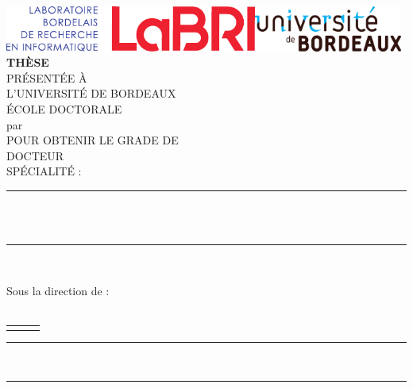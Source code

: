 \pagestyle{empty}

\pagestyle{plain} %

\newcommand{\exam}[5]{#1 \textsc{#2}  & #3, #4  & #5 \\}

\newcommand{\logoUB}{\includegraphics[height=1.5cm]{figures/ubdx-logo}}

\newcommand{\logoLaBRI}{\includegraphics[height=1.5cm]{figures/labri-logo}}


\begin{titlepage}
    \begin{center}
		\vspace*{-40pt}
		\logoLaBRI \hfill \logoUB \\
		\vfill
		\Huge  {\textbf{THÈSE}}\\
		\bigskip
		\large PRÉSENTÉE À\\
		\bigskip
		\huge  {L'UNIVERSITÉ DE BORDEAUX}\\
		\bigskip
		\Large ÉCOLE DOCTORALE {\ecoleDoctorale}\\
		\bigskip
		\Large par {\textbf{\myName}}\\
		\bigskip
		\Large POUR OBTENIR LE GRADE DE\\
		\bigskip
		\LARGE {DOCTEUR}\\
		\bigskip
		\large SPÉCIALITÉ : {\specialite}\\
		\vfill
		\rule{4em}{1pt}\\
		\bigskip
		\Large {{\myTitle}}\\
		\bigskip
		\rule{4em}{1pt}\\
		\medskip
		\vfill
	\end{center}
	\vfill
	 \quad {}
	\vfill
	\noindent Sous la direction de :  \directors\\

	 \\
	\begin{tabularx}{\textwidth}{p{}<{\dotfill}p{}<{\dotfill}@{}l}
		\jury
	\end{tabularx}
	\vfill
	\centering
	\large \rule[0.2em]{0.5em}{1pt}~{\annee}~\rule[0.2em]{0.5em}{1pt}
\end{titlepage}

